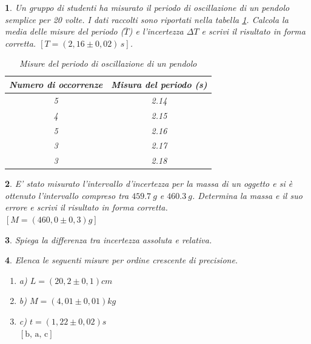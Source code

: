 \documentclass[12pt,a4paper,oneside]{book}
\theoremstyle{esercizio}
\newtheorem{esercizio}{}
\newenvironment{elenco}{\begin{enumerate}[label=\bfseries\alph*.]}{\end{enumerate}}
\begin{document}
\begin{esercizio}
Un gruppo di studenti ha misurato il periodo di oscillazione di un pendolo semplice per 20 volte. I dati raccolti sono riportati nella tabella \ref{tab:pend}. Calcola la media delle misure del periodo (\(\overline{T}\)) e l'incertezza $\Delta T$ e scrivi il risultato in forma corretta.
\hspace*{\fill} $\left[T=\left(2,16 \pm 0,02 \right) \,\si{s} \right]$.
\begin{table}[h!]
\centering
\caption{Misure del periodo di oscillazione di un pendolo}
\label{tab:pend}
\begin{tabular}{cc}
\toprule
\textbf{Numero di occorrenze} & \textbf{Misura del periodo (s)} \\
\midrule
5  & 2.14 \\
4  & 2.15 \\
5  & 2.16 \\
3  & 2.17 \\
3  & 2.18 \\
\bottomrule
\end{tabular}
\end{table}


\end{esercizio}


\begin{esercizio}
E' stato misurato l'intervallo d'incertezza per la massa di un oggetto e si è ottenuto l'intervallo compreso tra $\SI{459,7}{g}$ e $\SI{460,3}{g}$. Determina la massa e il suo errore e scrivi il risultato in forma corretta.\\
 \hspace*{\fill}  $\left[M=\left(460,0 \pm 0,3\right)\si{g}\right]$
\end{esercizio}


\begin{esercizio}
Spiega la differenza tra incertezza assoluta e relativa.
\end{esercizio}

\begin{esercizio}
Elenca le seguenti misure per ordine crescente di precisione.
\begin{multicols}{3}
\begin{elenco}
 \item[a)] $L=\left(20,2 \pm 0,1\right)\si{cm}$
 \item[b)] $M=\left(4,01 \pm 0,01\right)\si{kg}$
 \item[c)] $t=\left(1,22 \pm 0,02\right)\si{s}$ \\
 \hspace*{\fill}  $\left[\text{b, a, c}\right]$
\end{elenco}
\end{multicols}

\end{esercizio}
\end{document}
